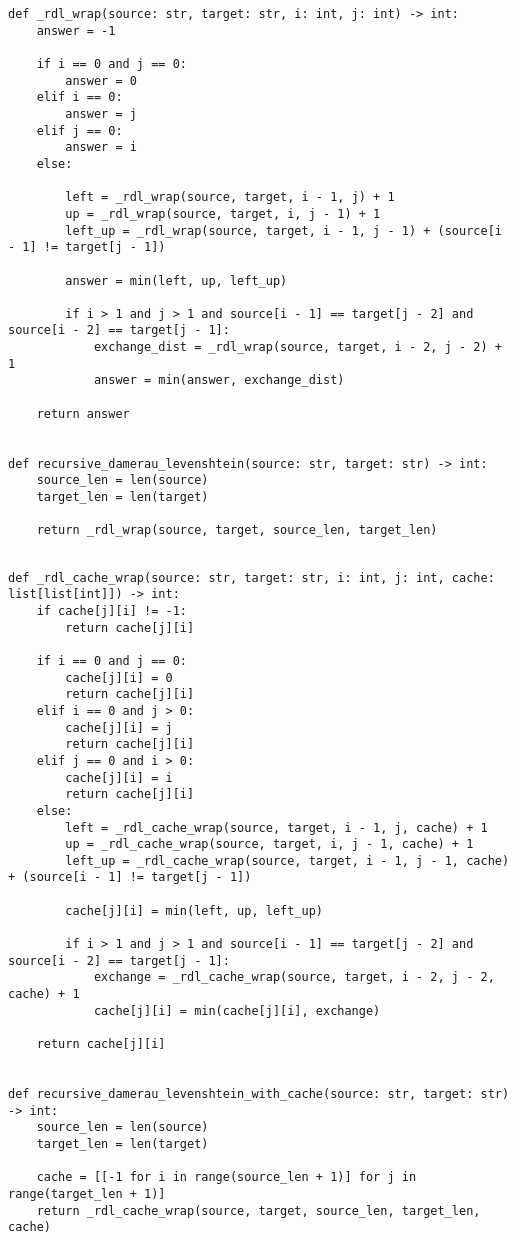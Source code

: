\begin{lstlisting}[label=lst:rec_dl,caption=Функция нахождения расстояния Дамерау--Левенштейна с использованием рекурсии.]
def _rdl_wrap(source: str, target: str, i: int, j: int) -> int:
    answer = -1

    if i == 0 and j == 0:
        answer = 0
    elif i == 0:
        answer = j
    elif j == 0:
        answer = i
    else:

        left = _rdl_wrap(source, target, i - 1, j) + 1
        up = _rdl_wrap(source, target, i, j - 1) + 1
        left_up = _rdl_wrap(source, target, i - 1, j - 1) + (source[i - 1] != target[j - 1])

        answer = min(left, up, left_up)

        if i > 1 and j > 1 and source[i - 1] == target[j - 2] and source[i - 2] == target[j - 1]:
            exchange_dist = _rdl_wrap(source, target, i - 2, j - 2) + 1
            answer = min(answer, exchange_dist)

    return answer


def recursive_damerau_levenshtein(source: str, target: str) -> int:
    source_len = len(source)
    target_len = len(target)

    return _rdl_wrap(source, target, source_len, target_len)
	
\end{lstlisting}

\begin{lstlisting}[label=lst:rec_dl_cache,caption=Функция нахождения расстояния Дамерау--Левенштейна рекурсивным методом с использованием кеша.]
def _rdl_cache_wrap(source: str, target: str, i: int, j: int, cache: list[list[int]]) -> int:
    if cache[j][i] != -1:
        return cache[j][i]

    if i == 0 and j == 0:
        cache[j][i] = 0
        return cache[j][i]
    elif i == 0 and j > 0:
        cache[j][i] = j
        return cache[j][i]
    elif j == 0 and i > 0:
        cache[j][i] = i
        return cache[j][i]
    else:
        left = _rdl_cache_wrap(source, target, i - 1, j, cache) + 1
        up = _rdl_cache_wrap(source, target, i, j - 1, cache) + 1
        left_up = _rdl_cache_wrap(source, target, i - 1, j - 1, cache) + (source[i - 1] != target[j - 1])

        cache[j][i] = min(left, up, left_up)

        if i > 1 and j > 1 and source[i - 1] == target[j - 2] and source[i - 2] == target[j - 1]:
            exchange = _rdl_cache_wrap(source, target, i - 2, j - 2, cache) + 1
            cache[j][i] = min(cache[j][i], exchange)

    return cache[j][i]


def recursive_damerau_levenshtein_with_cache(source: str, target: str) -> int:
    source_len = len(source)
    target_len = len(target)

    cache = [[-1 for i in range(source_len + 1)] for j in range(target_len + 1)]
    return _rdl_cache_wrap(source, target, source_len, target_len, cache)
\end{lstlisting}

